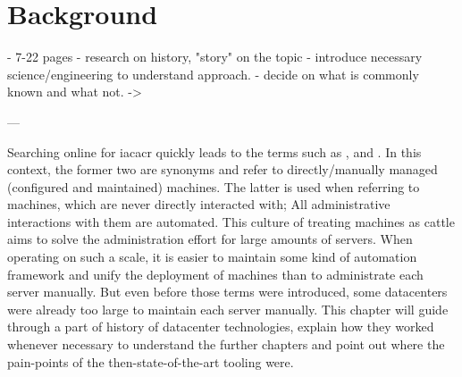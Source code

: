 \chapter{Background}

- 7-22 pages
- research on history, "story" on the topic
- introduce necessary science/engineering to understand approach.
  - decide on what is commonly known and what not. -> %

---


Searching online for \gls{iacacr} quickly leads to the terms such as ,  and .
In this context, the former two are synonyms and refer to directly/manually managed (configured and maintained) machines. The latter is used when referring to machines, which are never directly interacted with; All administrative interactions with them are automated.
This culture of treating machines as cattle aims to solve the administration effort for large amounts of servers. When operating on such a scale, it is easier to maintain some kind of automation framework and unify the deployment of machines than to administrate each server manually.
But even before those terms were introduced, some datacenters were already too large to maintain each server manually.
This chapter will guide through a part of history of datacenter technologies, explain how they worked whenever necessary to understand the further chapters and point out where the pain-points of the then-state-of-the-art tooling were.


